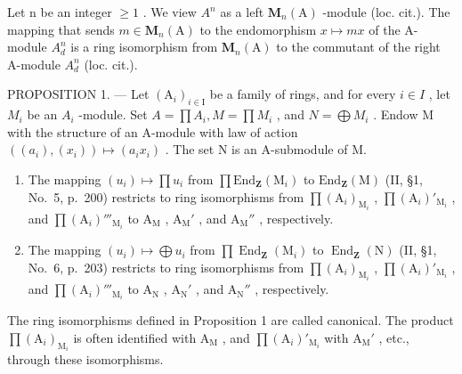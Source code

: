 Let n be an integer \(\geqslant 1\) . We view \(A^{n}\) as a left \(\mathbf{M}_{n}(\mathrm{A})\) -module (loc. cit.). The mapping that sends \(m \in \mathbf{M}_{n}(\mathrm{A})\) to the endomorphism \(x \mapsto mx\) of the A-module \(A_{d}^{n}\) is a ring isomorphism from \(\mathbf{M}_{n}(\mathrm{A})\) to the commutant of the right A-module \(A_{d}^{n}\) (loc. cit.).

PROPOSITION 1. --- Let \((\mathrm{A}_{i})_{i\in\mathrm{I}}\) be a family of rings, and for every \(i\in I\) , let \(M_{i}\) be an \(A_{i}\) -module. Set \(A=\prod A_{i}, M=\prod M_{i}\) , and \(N=\bigoplus M_{i}\) . Endow M with the structure of an A-module with law of action \(((a_{i}),(x_{i}))\mapsto(a_{i}x_{i})\) . The set N is an A-submodule of M.

\begin{enumerate}
\def\labelenumi{\alph{enumi})}
\item
  The mapping \((u_i) \mapsto \prod u_i\) from \(\prod \mathrm{End}_{\mathbf{Z}}(\mathrm{M}_i)\) to \(\mathrm{End}_{\mathbf{Z}}(\mathrm{M})\) (II, §1, No.~5, p.~200) restricts to ring isomorphisms from \(\prod (\mathrm{A}_i)_{\mathrm{M}_i}\) , \(\prod (\mathrm{A}_i)'_{\mathrm{M}_i}\) , and \(\prod (\mathrm{A}_i)'''_{\mathrm{M}_i}\) to \(\mathrm{A}_{\mathrm{M}}\) , \(\mathrm{A}_{\mathrm{M}}'\) , and \(\mathrm{A}_{\mathrm{M}}''\) , respectively.
\item
  The mapping \((u_i) \mapsto \bigoplus u_i\) from \(\prod \operatorname{End}_{\mathbf{Z}}(\mathrm{M}_i)\) to \(\operatorname{End}_{\mathbf{Z}}(\mathrm{N})\) (II, §1, No.~6, p.~203) restricts to ring isomorphisms from \(\prod (\mathrm{A}_i)_{\mathrm{M}_i}\) , \(\prod (\mathrm{A}_i)'_{\mathrm{M}_i}\) , and \(\prod (\mathrm{A}_i)'''_{\mathrm{M}_i}\) to \(\mathrm{A_N}\) , \(\mathrm{A_N}'\) , and \(\mathrm{A_N}''\) , respectively.
\end{enumerate}

The ring isomorphisms defined in Proposition 1 are called canonical. The product \(\prod (\mathrm{A}_i)_{\mathrm{M}_i}\) is often identified with \(\mathrm{A_M}\) , and \(\prod (\mathrm{A}_i)'_{\mathrm{M}_i}\) with \(\mathrm{A_M}'\) , etc., through these isomorphisms.

